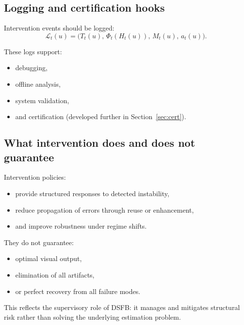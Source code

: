 \documentclass[11pt]{article}
\theoremstyle{definition}
\theoremstyle{plain}
\begin{document}

\subsection{Logging and certification hooks}

Intervention events should be logged:
\begin{equation}
\mathcal{L}_t(u)=
\bigl(
T_t(u),\,
\Phi_t(H_t(u)),\,
M_t(u),\,
a_t(u)
\bigr).
\end{equation}

These logs support:
\begin{itemize}[leftmargin=1.5em]
    \item debugging,
    \item offline analysis,
    \item system validation,
    \item and certification (developed further in Section~\ref{sec:cert}).
\end{itemize}


\subsection{What intervention does and does not guarantee}

Intervention policies:
\begin{itemize}[leftmargin=1.5em]
    \item provide structured responses to detected instability,
    \item reduce propagation of errors through reuse or enhancement,
    \item and improve robustness under regime shifts.
\end{itemize}

They do not guarantee:
\begin{itemize}[leftmargin=1.5em]
    \item optimal visual output,
    \item elimination of all artifacts,
    \item or perfect recovery from all failure modes.
\end{itemize}

This reflects the supervisory role of DSFB: it manages and mitigates structural risk rather than solving the underlying estimation problem.
\end{document}
